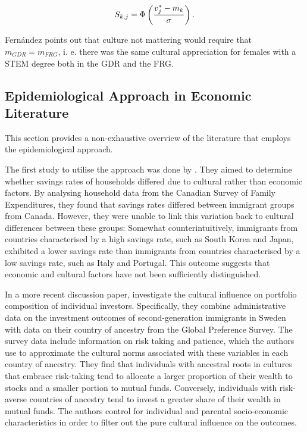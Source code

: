 \documentclass[a4paper, oneside, hyperfootnotes = false]{article}
\begin{document}
{\vspace{-8mm}

\begin{equation}
	\label{eq:sharecdfancestry}
	S_{k,j} = \Phi\left(\frac{v^{*}_{j} - m_{k}}{\sigma}\right)\textnormal{.}
\end{equation}

Fernández points out that culture not mattering would require that $m_{GDR} = m_{FRG}$, i. e. there was the same cultural appreciation for females with a STEM degree both in the GDR and the FRG.

\subsection{Epidemiological Approach in Economic Literature}
\label{epidliterature}

This section provides a non-exhaustive overview of the literature that employs the epidemiological approach.

The first study to utilise the approach was done by \cite{Carroll1999}.
They aimed to determine whether savings rates of households differed due to cultural rather than economic factors.
By analysing household data from the Canadian Survey of Family Expenditures, they found that savings rates differed between immigrant groups from Canada.
However, they were unable to link this variation back to cultural differences between these groups:
Somewhat counterintuitively, immigrants from countries characterised by a high savings rate, such as South Korea and Japan, exhibited a lower savings rate than immigrants from countries characterised by a low savings rate, such as Italy and Portugal.
This outcome suggests that economic and cultural factors have not been sufficiently distinguished.

In a more recent discussion paper, \cite{Ek2022} investigate the cultural influence on portfolio composition of individual investors.
Specifically, they combine administrative data on the investment outcomes of second-generation immigrants in Sweden with data on their country of ancestry from the Global Preference Survey.
The survey data include information on risk taking and patience, which the authors use to approximate the cultural norms associated with these variables in each country of ancestry.
They find that individuals with ancestral roots in cultures that embrace risk-taking tend to allocate a larger proportion of their wealth to stocks and a smaller portion to mutual funds.
Conversely, individuals with risk-averse countries of ancestry tend to invest a greater share of their wealth in mutual funds.
The authors control for individual and parental socio-economic characteristics in order to filter out the pure cultural influence on the outcomes.

}
\end{document}
